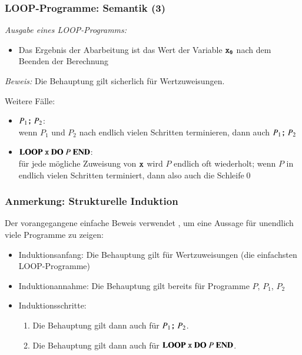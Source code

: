 \documentclass[onlymath]{beamer}
\begin{document}
\begin{frame}\frametitle{LOOP-Programme: Semantik (3)}

\emph{Ausgabe eines LOOP-Programms:}\\
\begin{itemize}
\item Das Ergebnis der Abarbeitung ist das Wert der Variable $\texttt{x}_{\texttt{0}}$ nach dem Beenden der Berechnung
\end{itemize}
\bigskip\pause


\pause
\emph{Beweis:} Die Behauptung gilt sicherlich für Wertzuweisungen.
\bigskip

Weitere Fälle:
\begin{itemize}
\item $P_1\texttt{;}{}~P_2$:\\
	wenn $P_1$ und $P_2$ nach endlich vielen Schritten terminieren, dann auch $P_1\texttt{;}{}~P_2$
\item $\textbf{LOOP}~\texttt{x}~\textbf{DO}~P~\textbf{END}{}$:\\
	für jede mögliche Zuweisung von $\texttt{x}$ wird $P$ endlich oft wiederholt;
	wenn $P$ in endlich vielen Schritten terminiert, dann also auch die Schleife\qed
\end{itemize}

\end{frame}

\begin{frame}\frametitle{Anmerkung: Strukturelle Induktion}

Der vorangegangene einfache Beweis verwendet , um eine
Aussage für unendlich viele Programme zu zeigen:
\begin{itemize}
\item \alert{Induktionsanfang:} Die Behauptung gilt für Wertzuweisungen (die einfachsten LOOP-Programme)
\item \alert{Induktionannahme:} Die Behauptung gilt bereits für Programme $P$, $P_1$, $P_2$
\item \alert{Induktionsschritte:}
\begin{enumerate}[(1)]
\item Die Behauptung gilt dann auch für $P_1\texttt{;}{}~P_2$.
\item Die Behauptung gilt dann auch für $\textbf{LOOP}~\texttt{x}~\textbf{DO}~P~\textbf{END}{}$.
\end{enumerate}
\end{itemize}
\bigskip


\end{frame}
\end{document}

